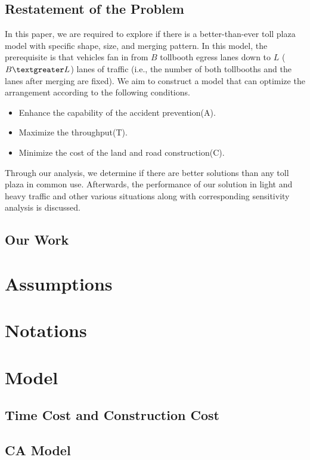 \documentclass{mcmthesis}
\begin{document}
\subsection{Restatement of the Problem}
In this paper, we are required to explore if there is a
better-than-ever toll plaza model with specific shape,
size, and merging pattern. In this model, the prerequisite
is that vehicles fan in from $B$ tollbooth egress lanes down
to $L$ ($B\textgreater L$) lanes of traffic (i.e., the number of both
tollbooths and the lanes after merging are fixed). We aim
to construct a model that can optimize the arrangement
according to the following conditions.

\begin{itemize}
\item Enhance the capability of the accident prevention(A).
\item Maximize the throughput(T).
\item Minimize the cost of the land and road
construction(C).
\end{itemize}

Through our analysis, we determine if there are better
solutions than any toll plaza in common use. Afterwards,
the performance of our solution in light and heavy traffic
and other various situations along with corresponding
sensitivity analysis is discussed.

\subsection{Our Work}

\section{Assumptions}

\section{Notations}

\section{Model}
\subsection{Time Cost and Construction Cost}
\subsection{CA Model}
\end{document}
